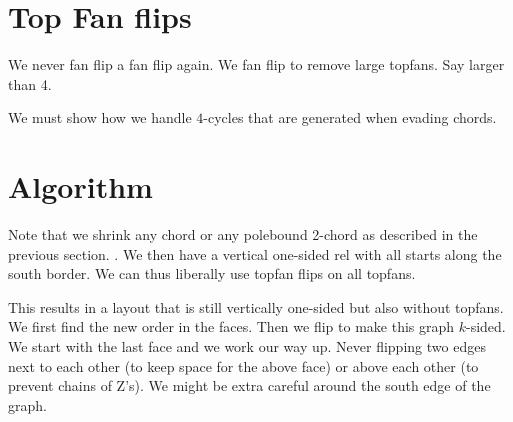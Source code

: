 
\section{Top Fan flips}

We never fan flip a fan flip again. We fan flip to remove large topfans. Say larger than 4.

We must show how we handle $4$-cycles that are generated when evading chords.


\section{Algorithm}
Note that we shrink any chord or any polebound 2-chord as described in the previous section. . We then have a vertical one-sided rel with all starts along the south border. We can thus liberally use topfan flips on all topfans.

This results in a layout that is still vertically one-sided but also without topfans. We first find the new order in the faces. Then we flip to make this graph $k$-sided. We start with the last face and we work our way up. Never flipping two edges next to each other (to keep space for the above face) or above each other (to prevent chains of Z's). We might be extra careful around the south edge of the graph.
